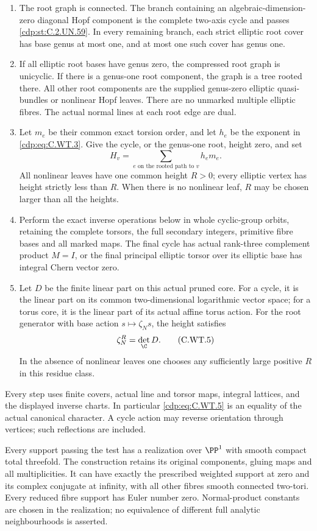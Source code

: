 \begin{proposition}
\begin{enumerate}
\item The root graph is connected. The branch containing an
algebraic-dimension-zero diagonal Hopf component is the complete
two-axis cycle and passes \ref{cdp:st:C.2.UN.59}. In every remaining branch,
each strict elliptic root cover has base genus at most one, and
at most one such cover has genus one.
\item If all elliptic root bases have genus zero, the compressed
root graph is unicyclic. If there is a genus-one root component,
the graph is a tree rooted there. All other root components are
the supplied genus-zero elliptic quasi-bundles or nonlinear
Hopf leaves. There are no unmarked multiple elliptic fibres.
The actual normal lines at each root edge are dual.
\item Let \(m_e\) be their common exact torsion order, and let
\(h_e\) be the exponent in \eqref{cdp:eq:C.WT.3}. Give the cycle, or the
genus-one root, height zero, and set
\[
       H_v=\sum_{e\text{ on the rooted path to }v}h_e m_e.
 \tag{C.WT.4}\label{cdp:eq:C.WT.4}
\]
All nonlinear leaves have one common height \(R>0\);
every elliptic vertex has height strictly less than \(R\).
When there is no nonlinear leaf, \(R\) may be chosen larger
than all the heights.
\item Perform the exact inverse operations below in whole
cyclic-group orbits, retaining the complete torsors, the full
secondary integers, primitive fibre bases and all marked maps.
The final cycle has actual rank-three complement product
\(M=I\), or the final principal elliptic torsor over its
elliptic base has integral Chern vector zero.
\item Let \(D\) be the finite linear part on this actual pruned
core. For a cycle, it is the linear part on its common
two-dimensional logarithmic vector space; for a torus core,
it is the linear part of its actual affine torus action.
For the root generator with base action \(s\mapsto\zeta_Ns\),
the height satisfies
\[
                         \zeta_N^R=\det_{\C}D.
 \tag{C.WT.5}\label{cdp:eq:C.WT.5}
\]
In the absence of nonlinear leaves one chooses any sufficiently
large positive \(R\) in this residue class.
\end{enumerate}

Every step uses finite covers, actual line and torsor maps,
integral lattices, and the displayed inverse charts. In
particular \eqref{cdp:eq:C.WT.5} is an equality of the actual canonical
character. A cycle action may reverse orientation through
vertices; such reflections are included.

Every support passing the test has a realization over
\(\PP^1\) with smooth compact total threefold. The construction
retains its original components, gluing maps and all
multiplicities. It can have exactly the prescribed weighted
support at zero and its complex conjugate at infinity, with
all other fibres smooth connected two-tori. Every reduced
fibre support has Euler number zero. Normal-product constants
are chosen in the realization; no equivalence of different
full analytic neighbourhoods is asserted.
\end{proposition}

